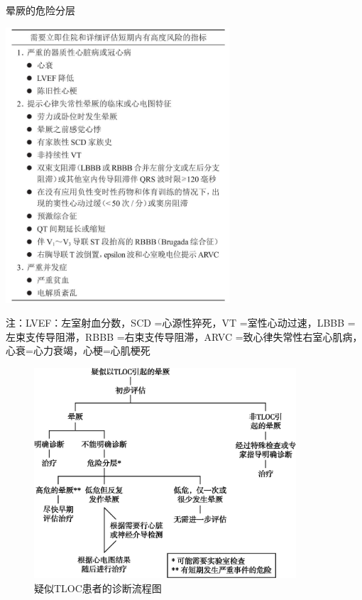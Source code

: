 \begin{table}[htbp]
\centering
\caption{晕厥的危险分层}
\label{tab4-2}
\includegraphics[width=3.28125in,height=4.04167in]{./images/Image00018.jpg}
\end{table}

注：LVEF：左室射血分数，SCD =心源性猝死，VT =室性心动过速，LBBB
=左束支传导阻滞，RBBB =右束支传导阻滞，ARVC
=致心律失常性右室心肌病，心衰=心力衰竭，心梗=心肌梗死

\begin{figure}[!htbp]
 \centering
 \includegraphics[width=3.84375in,height=3.08333in]{./images/Image00019.jpg}
 \captionsetup{justification=centering}
 \caption{疑似TLOC患者的诊断流程图}
 \label{fig4-1}
  \end{figure} 

